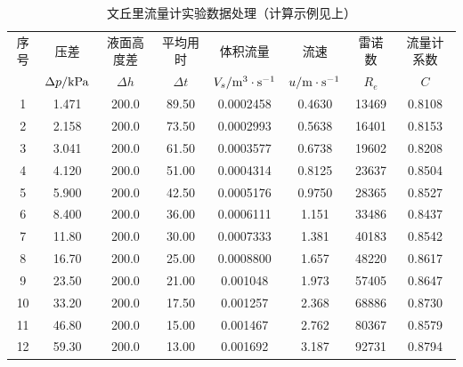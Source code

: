\documentclass[UTF8,AutoFakeBold,a4paper]{article}
\begin{document}
\begin{table}[h]
		\centering
		\begin{tabular}{cccccccc}
		\toprule
		
 序号 & 压差 & 液面高度差 & 平均用时 & 体积流量 & 流速 & 雷诺数 & 流量计系数 \\ 
  &$\Delta p/\rm{kPa}$&$\Delta h$&$\Delta t$&$V_{s}/\rm{m}^{3}\cdot\rm{s}^{-1}$&$u/\rm{m}\cdot\rm{s}^{-1}$&$R_{e}$&$C$\\
 \midrule
		1 & 1.471 & 200.0 & 89.50 & 0.0002458 & 0.4630 & 13469 & 0.8108 \\ 
        2 & 2.158 & 200.0 & 73.50 & 0.0002993 & 0.5638 & 16401 & 0.8153 \\ 
        3 & 3.041 & 200.0 & 61.50 & 0.0003577 & 0.6738 & 19602 & 0.8208 \\ 
        4 & 4.120 & 200.0 & 51.00 & 0.0004314 & 0.8125 & 23637 & 0.8504 \\ 
        5 & 5.900 & 200.0 & 42.50 & 0.0005176 & 0.9750 & 28365 & 0.8527 \\ 
        6 & 8.400 & 200.0 & 36.00 & 0.0006111 & 1.151 & 33486 & 0.8437 \\ 
        7 & 11.80 & 200.0 & 30.00 & 0.0007333 & 1.381 & 40183 & 0.8542 \\ 
        8 & 16.70 & 200.0 & 25.00 & 0.0008800 & 1.657 & 48220 & 0.8617 \\ 
        9 & 23.50 & 200.0 & 21.00 & 0.001048 & 1.973 & 57405 & 0.8647 \\ 
        10 & 33.20 & 200.0 & 17.50 & 0.001257 & 2.368 & 68886 & 0.8730 \\ 
        11 & 46.80 & 200.0 & 15.00 & 0.001467 & 2.762 & 80367 & 0.8579 \\ 
        12 & 59.30 & 200.0 & 13.00 & 0.001692 & 3.187 & 92731 & 0.8794 \\ 
		\bottomrule
		\end{tabular}	
		\label{ta1}
		\caption{文丘里流量计实验数据处理（计算示例见上）}
\end{table}
\end{document}
